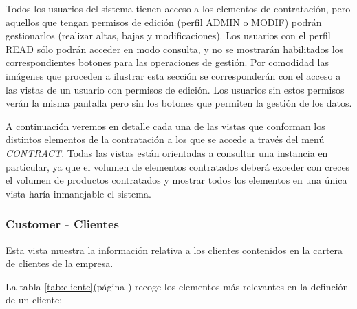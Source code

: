 Todos los usuarios del sistema tienen acceso a los elementos de contratación, pero aquellos que tengan permisos de edición (perfil ADMIN o MODIF) podrán gestionarlos (realizar altas, bajas y modificaciones). Los usuarios con el perfil READ sólo podrán acceder en modo consulta, y no se mostrarán habilitados los correspondientes botones para las operaciones de gestión. Por comodidad las imágenes que proceden a ilustrar esta sección se corresponderán con el acceso a las vistas de un usuario con permisos de edición. Los usuarios sin estos permisos verán la misma pantalla pero sin los botones que permiten la gestión de los datos.

A continuación veremos en detalle cada una de las vistas que conforman los distintos elementos de la contratación a los que se accede a través del menú  \emph{CONTRACT}. Todas las vistas están orientadas a consultar una instancia en particular, ya que el volumen de elementos contratados deberá exceder con creces el volumen de productos contratados y mostrar todos los elementos en una única vista haría inmanejable el sistema.



\subsubsection{Customer - Clientes}
\label{sub:customer}

Esta vista muestra la información relativa a los clientes contenidos en la cartera de clientes de la empresa.


La tabla \ref{tab:cliente}(página \pageref{tab:cliente}) recoge los elementos más relevantes en la definción de un cliente:

